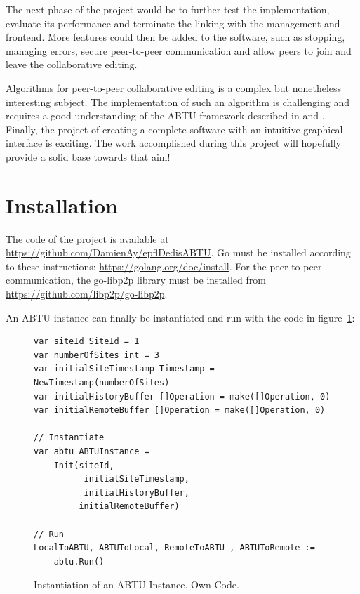 \documentclass[11pt, a4paper, oneside, openright]{article} %
\begin{document}
The next phase of the project would be to further test the implementation, evaluate its performance and terminate the linking with the management and frontend. More features could then be added to the software, such as stopping, managing errors, secure peer-to-peer communication and allow peers to join and leave the collaborative editing.

Algorithms for peer-to-peer collaborative editing is a complex but nonetheless interesting subject. The implementation of such an algorithm is challenging and requires a good understanding of the ABTU framework described in \cite{abtuu} and \cite{abtu}. Finally, the project of creating a complete software with an intuitive graphical interface is exciting. The work accomplished during this project will hopefully provide a solid base towards that aim!


{}

\pagebreak


\appendix
\section{Installation}
\label{appa}

The code of the project is available at \url{https://github.com/DamienAy/epflDedisABTU}. Go must be installed according to these instructions: \url{https://golang.org/doc/install}.
For the peer-to-peer communication, the go-libp2p library must be installed from \url{https://github.com/libp2p/go-libp2p}.

An ABTU instance can finally be instantiated and run with the code in figure~\ref{code:install}:

\begin{figure}[!h]
\begin{center}
\begin{lstlisting}
var siteId SiteId = 1
var numberOfSites int = 3
var initialSiteTimestamp Timestamp = NewTimestamp(numberOfSites)
var initialHistoryBuffer []Operation = make([]Operation, 0)
var initialRemoteBuffer []Operation = make([]Operation, 0)

// Instantiate
var abtu ABTUInstance =
	Init(siteId,
	      initialSiteTimestamp,
	      initialHistoryBuffer,
	     initialRemoteBuffer)

// Run
LocalToABTU, ABTUToLocal, RemoteToABTU , ABTUToRemote :=
	abtu.Run()
\end{lstlisting}
\end{center}
\caption{Instantiation of an ABTU Instance. Own Code.\label{code:install}}
\end{figure}
\end{document}
